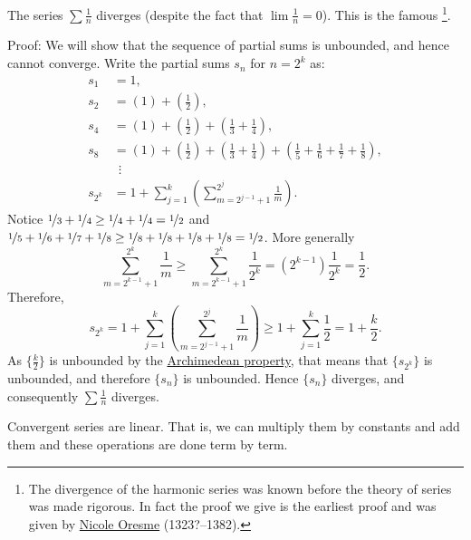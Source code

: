 \begin{example} \label{example:harmonicseries}
The series $\sum \frac{1}{n}$ diverges (despite the fact that $\lim
\frac{1}{n} = 0$).  This is the famous \emph{}%
\footnote{The divergence of the harmonic series was known 
before the theory of series was made rigorous.  In fact the proof we
give is the earliest proof and was given by
\href{https://en.wikipedia.org/wiki/Oresme}{Nicole Oresme}
(1323?--1382).}.

Proof: We will show that the sequence of partial sums is unbounded, and hence
cannot converge.
Write the partial sums $s_n$ for $n = 2^k$ as:
\begin{align*}
 s_1 & = 1 , \\
 s_2 & = \left( 1 \right) + \left( \frac{1}{2} \right) , \\
 s_4 & = \left( 1 \right) + \left( \frac{1}{2} \right) +
        \left( \frac{1}{3} + \frac{1}{4} \right) , \\
 s_8 & = \left( 1 \right) + \left( \frac{1}{2} \right) +
        \left( \frac{1}{3} + \frac{1}{4} \right) +
        \left( \frac{1}{5} + \frac{1}{6} + \frac{1}{7} + \frac{1}{8} \right) , \\
& ~~ \vdots \\
 s_{2^k} & = 
1 + 
\sum_{j=1}^k
\left(
\sum_{m=2^{j-1}+1}^{2^j} \frac{1}{m}
\right) .
\end{align*}
Notice $\nicefrac{1}{3} + \nicefrac{1}{4} \geq \nicefrac{1}{4} + \nicefrac{1}{4} =
\nicefrac{1}{2}$ and
$\nicefrac{1}{5} + \nicefrac{1}{6} + \nicefrac{1}{7} + \nicefrac{1}{8}
\geq \nicefrac{1}{8} + \nicefrac{1}{8} + \nicefrac{1}{8} + \nicefrac{1}{8} =
\nicefrac{1}{2}$.  More generally
\begin{equation*}
\sum_{m=2^{k-1}+1}^{2^k} \frac{1}{m}
\geq
\sum_{m=2^{k-1}+1}^{2^k} \frac{1}{2^k}
=
(2^{k-1}) \frac{1}{2^k} = \frac{1}{2} .
\end{equation*}
Therefore,
\begin{equation*}
s_{2^k} = 
1 + 
\sum_{j=1}^k
\left(
\sum_{m=2^{j-1}+1}^{2^j} \frac{1}{m}
\right) 
\geq
1 + \sum_{j=1}^k \frac{1}{2} = 1 + \frac{k}{2} .
\end{equation*}
As $\{ \frac{k}{2} \}$ is unbounded by the
\hyperref[thm:arch:i]{Archimedean property}, that means that
$\{ s_{2^k} \}$ is unbounded, and therefore $\{ s_n \}$ is unbounded.
Hence $\{ s_n \}$ diverges, and consequently $\sum \frac{1}{n}$ diverges.
\end{example}

Convergent series are linear.  That is, we can multiply them by constants
and add them and these operations are done term by term.


